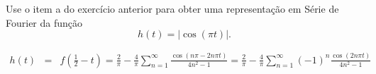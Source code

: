 \begin{exer}{\label{Fourier_9}}
 Use o item a do exercício anterior para obter uma representação em Série de Fourier da função \begin{equation}h(t)=|\cos(\pi t)|.\end{equation}
\end{exer}
\begin{resp}
 \begin{eqnarray*}
h(t)&=&f\left(\frac{1}{2}-t\right)=\frac{2}{\pi}- \frac{4}{\pi}\sum_{n=1}^\infty \frac{\cos\left(n\pi-2n\pi t\right)}{4n^2-1}=\frac{2}{\pi}- \frac{4}{\pi}\sum_{n=1}^\infty(-1)^n \frac{\cos\left(2n\pi t\right)}{4n^2-1}
 \end{eqnarray*}
\end{resp}
